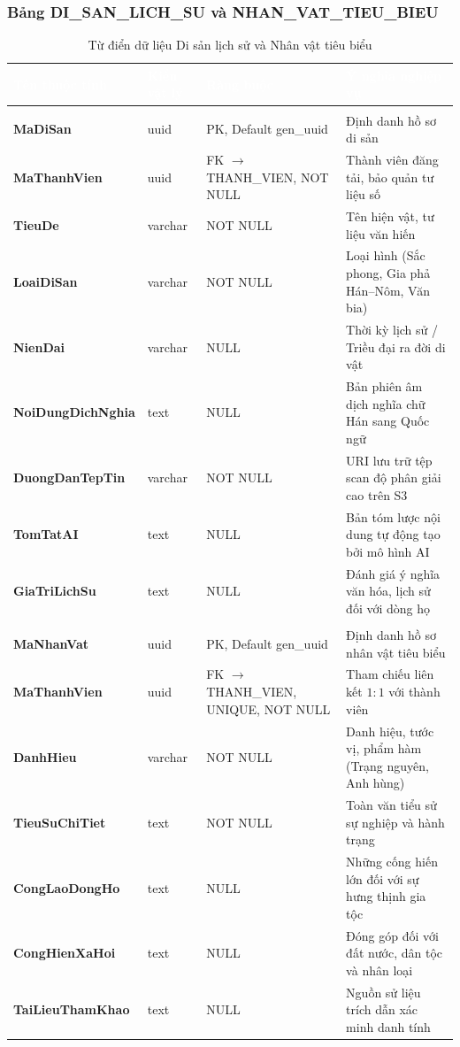 \subsubsection{Bảng DI\_SAN\_LICH\_SU và NHAN\_VAT\_TIEU\_BIEU}
\begin{table}[H]
\centering\small
\renewcommand{\arraystretch}{1.3}
\begin{tabularx}{\textwidth}{|>{\raggedright\arraybackslash\bfseries}p{3.2cm}|>{\raggedright\arraybackslash}p{2.3cm}|>{\raggedright\arraybackslash}p{3.2cm}|>{\raggedright\arraybackslash}X|}
\hline
\rowcolor{tableheader}
\textcolor{white}{\textbf{Tên thuộc tính}} & \textcolor{white}{\textbf{Kiểu vật lý}} & \textcolor{white}{\textbf{Ràng buộc}} & \textcolor{white}{\textbf{Ý nghĩa nghiệp vụ}} \\
\hline
\multicolumn{4}{|l|}{\cellcolor{softblue}\textbf{Bảng DI\_SAN\_LICH\_SU (Văn tự cổ, Sắc phong, Di vật)}} \\
\hline
MaDiSan & uuid & PK, Default gen\_uuid & Định danh hồ sơ di sản \\
\hline
MaThanhVien & uuid & FK $\to$ THANH\_VIEN, NOT NULL & Thành viên đăng tải, bảo quản tư liệu số \\
\hline
TieuDe & varchar & NOT NULL & Tên hiện vật, tư liệu văn hiến \\
\hline
LoaiDiSan & varchar & NOT NULL & Loại hình (Sắc phong, Gia phả Hán--Nôm, Văn bia) \\
\hline
NienDai & varchar & NULL & Thời kỳ lịch sử / Triều đại ra đời di vật \\
\hline
NoiDungDichNghia & text & NULL & Bản phiên âm dịch nghĩa chữ Hán sang Quốc ngữ \\
\hline
DuongDanTepTin & varchar & NOT NULL & URI lưu trữ tệp scan độ phân giải cao trên S3 \\
\hline
TomTatAI & text & NULL & Bản tóm lược nội dung tự động tạo bởi mô hình AI \\
\hline
GiaTriLichSu & text & NULL & Đánh giá ý nghĩa văn hóa, lịch sử đối với dòng họ \\
\hline
\multicolumn{4}{|l|}{\cellcolor{softblue}\textbf{Bảng NHAN\_VAT\_TIEU\_BIEU (Ghi danh công đức)}} \\
\hline
MaNhanVat & uuid & PK, Default gen\_uuid & Định danh hồ sơ nhân vật tiêu biểu \\
\hline
MaThanhVien & uuid & FK $\to$ THANH\_VIEN, UNIQUE, NOT NULL & Tham chiếu liên kết $1:1$ với thành viên \\
\hline
DanhHieu & varchar & NOT NULL & Danh hiệu, tước vị, phẩm hàm (Trạng nguyên, Anh hùng) \\
\hline
TieuSuChiTiet & text & NOT NULL & Toàn văn tiểu sử sự nghiệp và hành trạng \\
\hline
CongLaoDongHo & text & NULL & Những cống hiến lớn đối với sự hưng thịnh gia tộc \\
\hline
CongHienXaHoi & text & NULL & Đóng góp đối với đất nước, dân tộc và nhân loại \\
\hline
TaiLieuThamKhao & text & NULL & Nguồn sử liệu trích dẫn xác minh danh tính \\
\hline
\end{tabularx}
\caption{Từ điển dữ liệu Di sản lịch sử và Nhân vật tiêu biểu}
\label{tab:dict_heritage}
\end{table}

